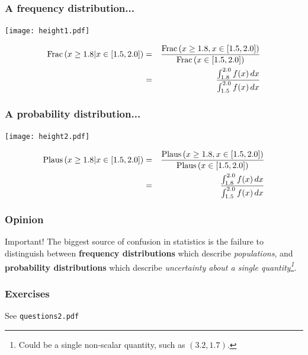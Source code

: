 \documentclass{beamer}
\begin{document}
\begin{frame}
\frametitle{A frequency distribution...}

\centering
\texttt{[image: height1.pdf]}

\begin{eqnarray*}
\textnormal{Frac}\left(x \geq 1.8 | x \in [1.5, 2.0]\right)
&=& 
\frac{\textnormal{Frac}\left(x \geq 1.8, x \in [1.5, 2.0]\right)}
{\textnormal{Frac}\left(x \in [1.5, 2.0]\right)}\\
&=& \frac{\int_{1.8}^{2.0} f(x) \, dx}{\int_{1.5}^{2.0} f(x) \, dx}
\end{eqnarray*}

\end{frame}


\begin{frame}
\frametitle{A probability distribution...}

\centering
\texttt{[image: height2.pdf]}

\begin{eqnarray*}
\textnormal{Plaus}\left(x \geq 1.8 | x \in [1.5, 2.0]\right)
&=& 
\frac{\textnormal{Plaus}\left(x \geq 1.8, x \in [1.5, 2.0]\right)}
{\textnormal{Plaus}\left(x \in [1.5, 2.0]\right)}\\
&=& \frac{\int_{1.8}^{2.0} f(x) \, dx}{\int_{1.5}^{2.0} f(x) \, dx}
\end{eqnarray*}

\end{frame}


\begin{frame}
\frametitle{Opinion}

\begin{alertblock}{Important!}
The biggest source of confusion in statistics is the failure to
distinguish between {\bf frequency distributions} which describe
{\em populations}, and {\bf probability distributions} which describe
{\em uncertainty about a single quantity\footnote{Could be a single
non-scalar quantity, such as $(3.2, 1.7)$.}}.
\end{alertblock}

\end{frame}

\begin{frame}
\frametitle{Exercises}

\vspace{3em}
\begin{center}
See {\tt questions2.pdf}
\end{center}

\end{frame}
\end{document}
